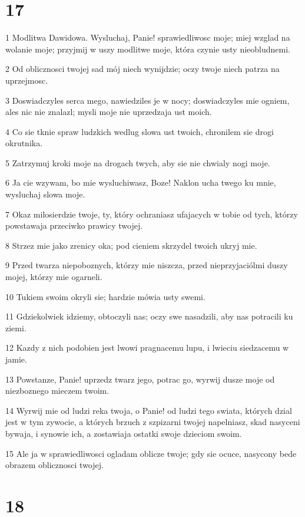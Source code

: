 \chapter{17}

\par 1 Modlitwa Dawidowa. Wysluchaj, Panie! sprawiedliwosc moje; miej wzglad na wolanie moje; przyjmij w uszy modlitwe moje, która czynie usty nieobludnemi.
\par 2 Od oblicznosci twojej sad mój niech wynijdzie; oczy twoje niech patrza na uprzejmosc.
\par 3 Doswiadczyles serca mego, nawiedziles je w nocy; doswiadczyles mie ogniem, ales nic nie znalazl; mysli moje nie uprzedzaja ust moich.
\par 4 Co sie tknie spraw ludzkich wedlug slowa ust twoich, chronilem sie drogi okrutnika.
\par 5 Zatrzymuj kroki moje na drogach twych, aby sie nie chwialy nogi moje.
\par 6 Ja cie wzywam, bo mie wysluchiwasz, Boze! Naklon ucha twego ku mnie, wysluchaj slowa moje.
\par 7 Okaz milosierdzie twoje, ty, który ochraniasz ufajacych w tobie od tych, którzy powstawaja przeciwko prawicy twojej.
\par 8 Strzez mie jako zrenicy oka; pod cieniem skrzydel twoich ukryj mie.
\par 9 Przed twarza niepoboznych, którzy mie niszcza, przed nieprzyjaciólmi duszy mojej, którzy mie ogarneli.
\par 10 Tukiem swoim okryli sie; hardzie mówia usty swemi.
\par 11 Gdziekolwiek idziemy, obtoczyli nas; oczy swe nasadzili, aby nas potracili ku ziemi.
\par 12 Kazdy z nich podobien jest lwowi pragnacemu lupu, i lwieciu siedzacemu w jamie.
\par 13 Powstanze, Panie! uprzedz twarz jego, potrac go, wyrwij dusze moje od niezboznego mieczem twoim.
\par 14 Wyrwij mie od ludzi reka twoja, o Panie! od ludzi tego swiata, których dzial jest w tym zywocie, a których brzuch z szpizarni twojej napelniasz, skad nasyceni bywaja, i synowie ich, a zostawiaja ostatki swoje dzieciom swoim.
\par 15 Ale ja w sprawiedliwosci ogladam oblicze twoje; gdy sie ocuce, nasycony bede obrazem oblicznosci twojej.

\chapter{18}

